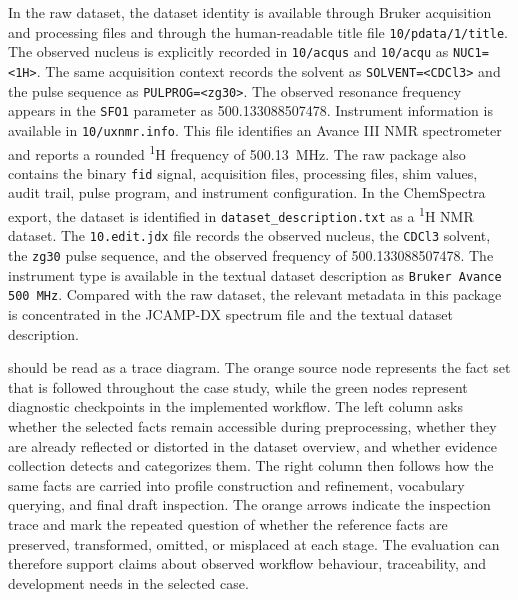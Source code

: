 In the raw dataset, the dataset identity is available through Bruker acquisition and processing files and through the human-readable title file \texttt{10/pdata/1/title}.
The observed nucleus is explicitly recorded in \texttt{10/acqus} and \texttt{10/acqu} as \texttt{NUC1=<1H>}.
The same acquisition context records the solvent as \texttt{SOLVENT=<CDCl3>} and the pulse sequence as \texttt{PULPROG=<zg30>}.
The observed resonance frequency appears in the \texttt{SFO1} parameter as 500.133088507478.
Instrument information is available in \texttt{10/uxnmr.info}.
This file identifies an Avance III NMR spectrometer and reports a rounded \textsuperscript{1}H frequency of 500.13~MHz.
The raw package also contains the binary \texttt{fid} signal, acquisition files, processing files, shim values, audit trail, pulse program, and instrument configuration.
In the ChemSpectra export, the dataset is identified in \texttt{dataset\_description.txt} as a \textsuperscript{1}H NMR dataset.
The \texttt{10.edit.jdx} file records the observed nucleus, the \texttt{CDCl3} solvent, the \texttt{zg30} pulse sequence, and the observed frequency of 500.133088507478.
The instrument type is available in the textual dataset description as \texttt{Bruker Avance 500 MHz}.
Compared with the raw dataset, the relevant metadata in this package is concentrated in the \ac{JCAMP-DX} spectrum file and the textual dataset description.

 should be read as a trace diagram.
The orange source node represents the fact set that is followed throughout the case study, while the green nodes represent diagnostic checkpoints in the implemented workflow.
The left column asks whether the selected facts remain accessible during preprocessing, whether they are already reflected or distorted in the dataset overview, and whether evidence collection detects and categorizes them.
The right column then follows how the same facts are carried into profile construction and refinement, vocabulary querying, and final draft inspection.
The orange arrows indicate the inspection trace and mark the repeated question of whether the reference facts are preserved, transformed, omitted, or misplaced at each stage.
The evaluation can therefore support claims about observed workflow behaviour, traceability, and development needs in the selected case.


